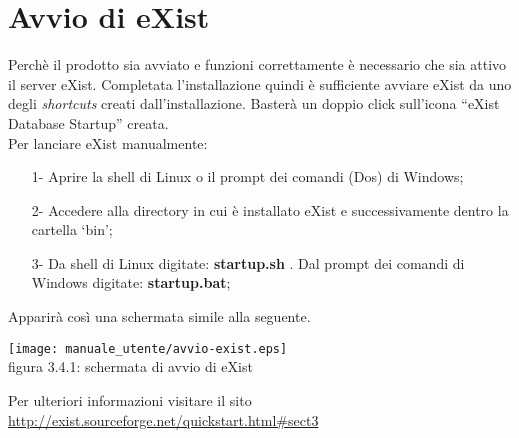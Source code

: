 \section{Avvio di eXist}
Perch\`e il prodotto sia avviato e funzioni correttamente \`e necessario che sia attivo il server eXist. Completata l'installazione quindi è sufficiente avviare eXist da uno degli \textit{shortcuts} creati dall'installazione. Baster\`a un doppio click sull'icona ``eXist Database Startup'' creata.\\
Per lanciare eXist manualmente:
\begin{itemize}
\item[1-] Aprire la shell di Linux o il prompt dei comandi (Dos) di Windows;
\item[2-] Accedere alla directory in cui \`e installato eXist e successivamente dentro la cartella `bin';
\item[3-] Da shell di Linux digitate:  \textbf{startup.sh} . Dal prompt dei comandi di Windows digitate: \textbf{startup.bat};
\end{itemize}	
Apparir\`a cos\`i una schermata simile alla seguente.
\begin{center}
\texttt{[image: manuale\_utente/avvio-exist.eps]}\\
figura 3.4.1: schermata di avvio di eXist
\end{center}
Per ulteriori informazioni visitare il sito\\
 \href{http://exist.sourceforge.net/quickstart.html\#sect3}{ http://exist.sourceforge.net/quickstart.html\#sect3}


